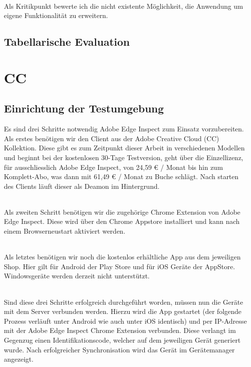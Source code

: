 		\\Als Kritikpunkt bewerte ich die nicht existente Möglichkeit, die Anwendung um eigene Funktionalität zu erweitern.

		\subsection{Tabellarische Evaluation}
	
	\pagebreak
	\section{ CC }
		\subsection {Einrichtung der Testumgebung}
		Es sind drei Schritte notwendig Adobe Edge Inspect zum Einsatz vorzubereiten. Als erstes benötigen wir den Client aus der Adobe Creative Cloud (CC) Kollektion. Diese gibt es zum Zeitpunkt dieser Arbeit in verschiedenen Modellen und beginnt bei der kostenlosen 30-Tage Testversion, geht über die Einzellizenz, für ausschliesslich Adobe Edge Inspect, von 24,59 € / Monat bis hin zum Komplett-Abo, was dann mit 61,49 € / Monat zu Buche schlägt. Nach starten des Clients läuft dieser als Deamon im Hintergrund. 
		
		\\Als zweiten Schritt benötigen wir die zugehörige Chrome Extension von Adobe Edge Inspect. Diese wird über den Chrome Appstore installiert und kann nach einem Browserneustart aktiviert werden.
		
		\\Als letztes benötigen wir noch die kostenlos erhältliche App aus dem jeweiligen Shop. Hier gilt für Android der Play Store und für iOS Geräte der AppStore. Windowsgeräte werden derzeit nicht unterstützt.
		
		\\Sind diese drei Schritte erfolgreich durchgeführt worden, müssen nun die Geräte mit dem Server verbunden werden. Hierzu wird die App gestartet (der folgende Prozess verläuft unter Android wie auch unter iOS identisch) und per IP-Adresse mit der Adobe Edge Inspect Chrome Extension verbunden. Diese verlangt im Gegenzug einen Identifikationscode, welcher auf dem jeweiligen Gerät generiert wurde. Nach erfolgreicher Synchronisation wird das Gerät im Gerätemanager angezeigt.

